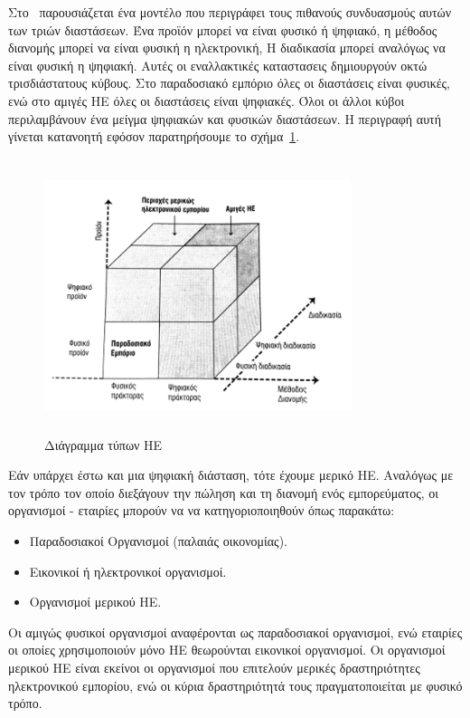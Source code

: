 \documentclass[12pt]{report}
\begin{document}
Στο~\cite{choi_stahl_whinston_1997} παρουσιάζεται ένα μοντέλο που περιγράφει τους πιθανούς συνδυασμούς αυτών των τριών διαστάσεων. Ένα προϊόν μπορεί να είναι φυσικό ή ψηφιακό, η μέθοδος διανομής μπορεί να είναι φυσική η ηλεκτρονική, Η διαδικασία μπορεί αναλόγως να είναι φυσική η ψηφιακή. Αυτές οι εναλλακτικές καταστασεις δημιουργούν οκτώ τρισδιάστατους κύβους. Στο παραδοσιακό εμπόριο όλες οι διαστάσεις είναι φυσικές, ενώ στο αμιγές ΗΕ όλες οι διαστάσεις είναι ψηφιακές. Όλοι οι άλλοι κύβοι περιλαμβάνουν ένα μείγμα ψηφιακών και φυσικών διαστάσεων. Η περιγραφή αυτή γίνεται κατανοητή εφόσον παρατηρήσουμε το σχήμα~\ref{fig:ec_dimensions}.
\begin{figure}[h]
\centering
\includegraphics[width=0.8\textwidth, height=8cm]{ec-dimensions}
\caption{Διάγραμμα τύπων ΗΕ}
\label{fig:ec_dimensions}
\end{figure}
Εάν υπάρχει έστω και μια ψηφιακή διάσταση, τότε έχουμε μερικό ΗΕ. Αναλόγως με τον τρόπο τον οποίο διεξάγουν την πώληση και τη διανομή ενός εμπορεύματος, οι οργανισμοί - εταιρίες μπορούν να να κατηγοριοποιηθούν όπως παρακάτω:
\begin{itemize}
  \item Παραδοσιακοί Οργανισμοί (παλαιάς οικονομίας).
  \item Εικονικοί ή ηλεκτρονικοί οργανισμοί.
  \item Οργανισμοί μερικού ΗΕ.
\end{itemize}
Οι αμιγώς φυσικοί οργανισμοί αναφέρονται ως παραδοσιακοί οργανισμοί, ενώ εταιρίες οι οποίες χρησιμοποιούν μόνο ΗΕ θεωρούνται εικονικοί οργανισμοί. Οι οργανισμοί μερικού ΗΕ είναι εκείνοι οι οργανισμοί που επιτελούν μερικές δραστηριότητες ηλεκτρονικού εμπορίου, ενώ οι κύρια δραστηριότητά τους πραγματοποιείται με φυσικό τρόπο.
\end{document}
